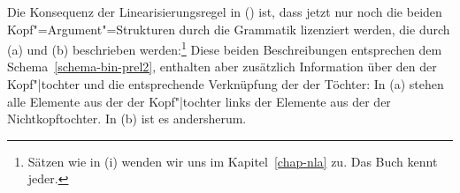 Die Konsequenz der Linearisierungsregel in () ist, dass jetzt nur noch die beiden 
Kopf"=Argument"=Strukturen durch die Grammatik lizenziert werden, die durch (a) und
(b) beschrieben werden:\footnote{
  Sätzen wie in (i) wenden wir uns im Kapitel~\ref{chap-nla} zu.
  \ea
  Das Buch kennt jeder.
  \zlast
}
\eal
\ex {}
\ex {}
\zl
Diese beiden Beschreibungen entsprechen dem Schema~\ref{schema-bin-prel2},
enthalten aber zusätzlich Information über den \initialw der
Kopf"|tochter und die entsprechende Verknüpfung der \phonwe
der Töchter: In (a) stehen alle Elemente aus der \phonl der Kopf"|tochter
links der Elemente aus der \phonl der Nichtkopftochter. In (b)
ist es andersherum.

